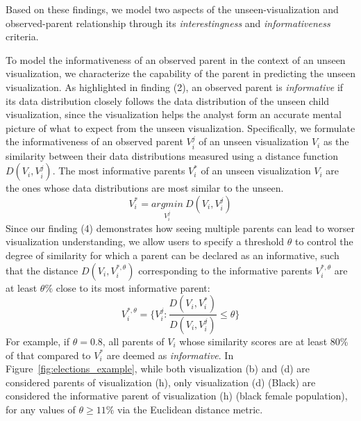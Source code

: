 \npar Based on these findings, we model two aspects of the unseen-visualization and observed-parent relationship through its \textit{interestingness} and \textit{informativeness} criteria.

 To model the informativeness of an observed parent in the context of an unseen visualization, we characterize the capability of the parent in predicting the unseen visualization. As highlighted in finding (2), an observed parent is \emph{informative} if its data distribution closely follows the data distribution of the unseen child visualization, since the visualization helps the analyst form an accurate mental picture of what to expect from the unseen visualization. Specifically, we formulate the informativeness of an observed parent $V_i^j$ of an unseen visualization $V_i$ as the similarity between their data distributions measured using a distance function $D(V_i, V_i^j)$. The most informative parents $V_i^*$ of an unseen visualization $V_i$ are the ones whose data distributions are most similar to the unseen.
\begin{equation}
    V_i^*=\underset{V_i^j}{argmin}\ D(V_i, V_i^j)
\end{equation}
Since our finding (4) demonstrates how seeing multiple parents can lead to worser visualization understanding, we allow users to specify a threshold $\theta$ to control the degree of similarity for which a parent can be declared as an informative, such that the distance $D(V_i, V_i^{*, \theta})$ corresponding to the informative parents $V_i^{*, \theta}$ are at least $\theta\%$ close to its most informative parent:
\begin{equation}
    V_i^{*, \theta} = \{V_i^j : \frac{D(V_i, V_i^*)}{D(V_i, V_i^j)} \leq \theta\}
\end{equation}
For example, if $\theta = 0.8$, all parents of $V_i$ whose similarity scores are at least 80\% of that compared to $V_i^*$ are deemed as \textit{informative}. In Figure~\ref{fig:elections_example}, while both visualization (b) and (d) are considered parents of visualization (h), only visualization (d) (Black) are considered the informative parent of visualization (h) (black female population), for any values of $\theta \geq 11\%$ via the Euclidean distance metric. %

